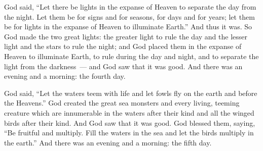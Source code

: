 \begin{inparaenum}
   God said, ``Let there be lights in the expanse of Heaven to separate the day from the night. Let them be for signs and for seasons, for days and for years;%
   let them be for lights in the expanse of Heaven to illuminate Earth.'' And thus it was.%
   So God made the two great lights: the greater light to rule the day and the lesser light and the stars to rule the night;%
   and God placed them in the expanse of Heaven to illuminate Earth,%
   to rule during the day and night, and to separate the light from the darkness~--- and God saw that it was good.%
   And there was an evening and a morning: the fourth day.%

   God said, ``Let the waters teem with life and let fowls fly on the earth and before the Heavens.''%
   God created the great sea monsters and every living, teeming creature which are innumerable in the waters after their kind and all the winged birds after their kind. And God saw that it was good.%
   God blessed them, saying, ``Be fruitful and multiply. Fill the waters in the sea and let the birds multiply in the earth.''%
   And there was an evening and a morning: the fifth day.%


\end{inparaenum}
